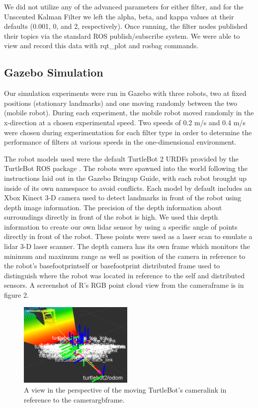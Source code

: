 \documentclass[conference]{IEEEtran} \usepackage[T1]{fontenc} \usepackage[backend=biber, style=ieee]{biblatex}
\begin{document}
We did not utilize any of the advanced parameters for either filter, and for the Unscented Kalman Filter we left the
alpha, beta, and kappa values at their defaults (0.001, 0, and 2, respectively). Once running, the filter nodes
published their topics via the standard ROS publish/subscribe system. We were able to view and record this data 
with rqt\_plot and rosbag commands.


\subsection{Gazebo Simulation} \label{Gazebo Simulation} Our simulation experiments were run in Gazebo with three
robots, two at fixed positions (stationary landmarks) and one moving randomly between the two (mobile robot). During
each experiment, the mobile robot moved randomly in the x-direction at a chosen experimental speed. Two speeds of 0.2
m/s and 0.4 m/s were chosen during experimentation for each filter type in order to determine the performance of filters
at various speeds in the one-dimensional environment.

The robot models used were the default TurtleBot 2 URDFs provided by the TurtleBot ROS package \cite{turtlebot}. The
robots were spawned into the world following the instructions laid out in the Gazebo Bringup Guide, with each robot
brought up inside of its own namespace to avoid conflicts. Each model by default includes an Xbox Kinect 3-D
camera used to detect landmarks in front of the robot using depth image information. The precision of the depth information
about surroundings directly in front of the robot is high. We used this depth information to create our own lidar 
sensor by using a specific angle of points directly in front of the robot. These points were used as a laser scan to emulate
a lidar 3-D laser scanner. The depth camera has its own frame which monitors the minimum and maximum range as well as position
of the camera in reference to the robot's base\textunderscore footprint\textunderscore self or base\textunderscore footprint\textunderscore
distributed frame used to distinguish where the robot was located in reference to the self and distributed sensors. A screenshot 
of R's RGB point cloud view from the camera\textunderscore frame is in figure 2.

\begin{figure}
\label{pic2} 
\centering 
\includegraphics[width=0.49\textwidth]{t2_camera_link}
\caption{A view in the perspective of the moving TurtleBot's camera\textunderscore link in reference to the camera\textunderscore rgb\textunderscore frame.}
\end{figure}
\end{document}
